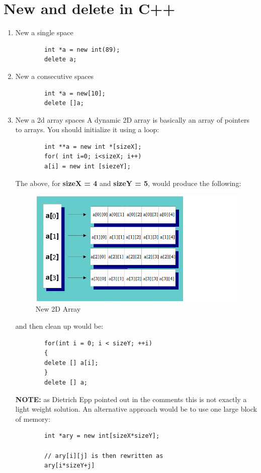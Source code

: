 	\section{New and delete in C++}
	\begin{enumerate}
		\item New a single space
		\begin{verbatim}
		int *a = new int(89);
		delete a;
		\end{verbatim}
		
		\item New a consecutive spaces
		\begin{verbatim}
		int *a = new[10];
		delete []a;
		\end{verbatim}
		
		\item New a 2d array spaces
		A dynamic 2D array is basically an array of pointers to arrays. You should initialize it using a loop:
		\begin{verbatim}
		int **a = new int *[sizeX];
		for( int i=0; i<sizeX; i++)
		a[i] = new int [siezeY];
		\end{verbatim}
		The above, for \textbf{sizeX = 4} and \textbf{sizeY = 5}, would produce the following:
		
		\begin{figure}[htb]
			\centering
			\includegraphics[width=0.7\linewidth]{New2DArray}
			\caption{New 2D Array}
			\label{fig:New2DArray}
		\end{figure}
		
		and then clean up would be:
		\begin{verbatim}
		for(int i = 0; i < sizeY; ++i) 
		{
		delete [] a[i];
		}
		delete [] a;
		\end{verbatim}
		
		\textbf{NOTE:} as Dietrich Epp pointed out in the comments this is not exactly a light weight solution. An alternative approach would be to use one large block of memory:
		
		\begin{verbatim}
		int *ary = new int[sizeX*sizeY];
		
		// ary[i][j] is then rewritten as
		ary[i*sizeY+j]
		\end{verbatim}
		
	\end{enumerate}
	

